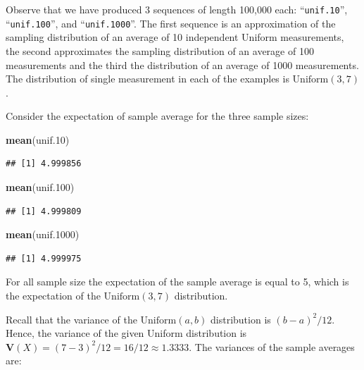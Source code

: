 \documentclass[
]{krantz}
\makeatletter
\newenvironment{Shaded}{\begin{snugshade}}{\end{snugshade}}
\newcommand{\FloatTok}[1]{\textcolor[rgb]{0.00,0.00,0.81}{#1}}
\newcommand{\KeywordTok}[1]{\textcolor[rgb]{0.13,0.29,0.53}{\textbf{#1}}}
\newcommand{\NormalTok}[1]{#1}
\newcommand{\Var}{\mathbf{V}}
\newenvironment{kframe}{%
\medskip{}
\setlength{\fboxsep}{.8em}
 \def\at@end@of@kframe{}%
 \ifinner\ifhmode%
  \def\at@end@of@kframe{\end{minipage}}%
  \begin{minipage}{\columnwidth}%
 \fi\fi%
 \def\FrameCommand##1{\hskip\@totalleftmargin \hskip-\fboxsep
 \colorbox{shadecolor}{##1}\hskip-\fboxsep
     \hskip-\linewidth \hskip-\@totalleftmargin \hskip\columnwidth}%
 \MakeFramed {\advance\hsize-\width
   \@totalleftmargin\z@ \linewidth\hsize
   \@setminipage}}%
 {\par\unskip\endMakeFramed%
 \at@end@of@kframe}
\renewenvironment{Shaded}{\begin{kframe}}{\end{kframe}}
\theoremstyle{definition}
\theoremstyle{definition}
\theoremstyle{definition}
\theoremstyle{remark}
\makeatother
\begin{document}
Observe that we have produced 3 sequences of length 100,000 each:
``\texttt{unif.10}'', ``\texttt{unif.100}'', and ``\texttt{unif.1000}''. The first sequence is an
approximation of the sampling distribution of an average of 10
independent Uniform measurements, the second approximates the sampling
distribution of an average of 100 measurements and the third the
distribution of an average of 1000 measurements. The distribution of
single measurement in each of the examples is \(\mathrm{Uniform}(3,7)\).

Consider the expectation of sample average for the three sample sizes:

\begin{Shaded}
\begin{Highlighting}[]
\KeywordTok{mean}\NormalTok{(unif}\FloatTok{.10}\NormalTok{)}
\end{Highlighting}
\end{Shaded}

\begin{verbatim}
## [1] 4.999856
\end{verbatim}

\begin{Shaded}
\begin{Highlighting}[]
\KeywordTok{mean}\NormalTok{(unif}\FloatTok{.100}\NormalTok{)}
\end{Highlighting}
\end{Shaded}

\begin{verbatim}
## [1] 4.999809
\end{verbatim}

\begin{Shaded}
\begin{Highlighting}[]
\KeywordTok{mean}\NormalTok{(unif}\FloatTok{.1000}\NormalTok{)}
\end{Highlighting}
\end{Shaded}

\begin{verbatim}
## [1] 4.999975
\end{verbatim}

For all sample size the expectation of the sample average is equal to 5,
which is the expectation of the \(\mathrm{Uniform}(3,7)\) distribution.

Recall that the variance of the \(\mathrm{Uniform}(a,b)\) distribution is
\((b-a)^2/12\). Hence, the variance of the given Uniform distribution is
\(\Var(X) = (7-3)^2/12 = 16/12 \approx 1.3333\). The variances of the
sample averages are:
\end{document}
